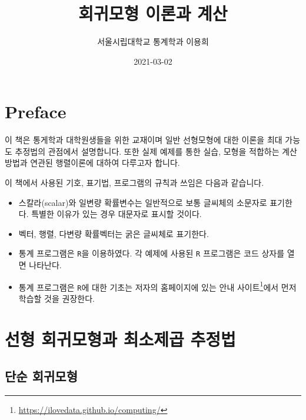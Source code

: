 \documentclass[
]{book}
\title{회귀모형 이론과 계산}
\author{서울시립대학교 통계학과 이용희}
\date{2021-03-02}
\makeatletter
\providecommand{\tightlist}{%
  \setlength{\itemsep}{0pt}\setlength{\parskip}{0pt}}
\renewcommand{\href}[2]{#2\footnote{\url{#1}}}
\newenvironment{kframe}{%
\medskip{}
\setlength{\fboxsep}{.8em}
 \def\at@end@of@kframe{}%
 \ifinner\ifhmode%
  \def\at@end@of@kframe{\end{minipage}}%
  \begin{minipage}{\columnwidth}%
 \fi\fi%
 \def\FrameCommand##1{\hskip\@totalleftmargin \hskip-\fboxsep
 \colorbox{shadecolor}{##1}\hskip-\fboxsep
     \hskip-\linewidth \hskip-\@totalleftmargin \hskip\columnwidth}%
 \MakeFramed {\advance\hsize-\width
   \@totalleftmargin\z@ \linewidth\hsize
   \@setminipage}}%
 {\par\unskip\endMakeFramed%
 \at@end@of@kframe}
\newenvironment{rmdblock}[1]
  {
  \begin{itemize}
  \renewcommand{\labelitemi}{
    \raisebox{-.7\height}[0pt][0pt]{
      {\setkeys{Gin}{width=3em,keepaspectratio}\texttt{[image: images/\#1]}}
    }
  }
  \setlength{\fboxsep}{1em}
  \begin{kframe}
  \item
  }
  {
  \end{kframe}
  \end{itemize}
  }
\newenvironment{rmdimportant}
  {\begin{rmdblock}{important}}
  {\end{rmdblock}}
\theoremstyle{definition}
\theoremstyle{definition}
\theoremstyle{definition}
\theoremstyle{remark}
\makeatother
\begin{document}
\maketitle

{
\setcounter{tocdepth}{1}
\tableofcontents
}
\hypertarget{preface}{%
\chapter*{Preface}\label{preface}}


이 책은 통게학과 대학원생들을 위한 교재이며 일반 선형모형에 대한 이론을 최대 가능도 추정법의 관점에서 설명합니다. 또한 실제 예제를 통한 실습, 모형을 적합하는 계산방법과 연관된 행렬이론에 대하여 다루고자 합니다.

\begin{rmdimportant}
이 책에서 사용된 기호, 표기법, 프로그램의 규칙과 쓰임은 다음과 같습니다.

\begin{itemize}
\tightlist
\item
  스칼라(scalar)와 일변량 확률변수는 일반적으로 보통 글씨체의 소문자로 표기한다. 특별한 이유가 있는 경우 대문자로 표시할 것이다.
\item
  벡터, 행렬, 다변량 확률벡터는 굵은 글씨체로 표기한다.
\item
  통계 프로그램은 \texttt{R}을 이용하였다. 각 예제에 사용된 \texttt{R} 프로그램은 코드 상자를 열면 나타난다.
\item
  통계 프로그램은 \texttt{R}에 대한 기초는 저자의 홈페이지에 있는 \href{https://ilovedata.github.io/computing/}{안내 사이트}에서 먼저 학습할 것을 권장한다.
\end{itemize}
\end{rmdimportant}

\mainmatter

\hypertarget{uxc120uxd615-uxd68cuxadc0uxbaa8uxd615uxacfc-uxcd5cuxc18cuxc81cuxacf1-uxcd94uxc815uxbc95}{%
\chapter{선형 회귀모형과 최소제곱 추정법}\label{uxc120uxd615-uxd68cuxadc0uxbaa8uxd615uxacfc-uxcd5cuxc18cuxc81cuxacf1-uxcd94uxc815uxbc95}}

\hypertarget{uxb2e8uxc21c-uxd68cuxadc0uxbaa8uxd615}{%
\section{단순 회귀모형}\label{uxb2e8uxc21c-uxd68cuxadc0uxbaa8uxd615}}
\end{document}
